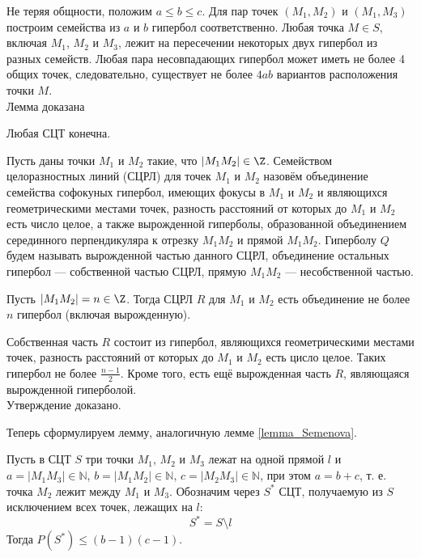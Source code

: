 \dokvo
	Не теряя общности, положим $a\leq b \leq c$.
	Для пар точек $(M_1,M_2)$ и $(M_1,M_3)$ построим семейства из $a$ и $b$ гипербол соответственно.
	Любая точка $M\in S$, включая $M_1$, $M_2$ и $M_3$, лежит на пересечении некоторых двух гипербол из разных семейств.
	Любая пара несовпадающих гипербол может иметь не более 4 общих точек, следовательно, существует не более $4ab$ вариантов расположения точки $M$.
\\ Лемма доказана

\begin{sledstvie}
	Любая СЦТ конечна.
\end{sledstvie}


\begin{opr}
	Пусть даны точки $M_1$ и $M_2$ такие, что $|M_1 M_2|\in\Z$.
	Семейством целоразностных линий (СЦРЛ) для точек $M_1$ и $M_2$ назовём объединение семейства софокуных гипербол,
	имеющих фокусы в $M_1$ и $M_2$ и являющихся геометрическими местами точек, разность расстояний от которых до $M_1$ и $M_2$ есть число целое,
	а также вырожденной гиперболы,
	образованной объединением серединного перпендикуляра к отрезку $M_1 M_2$ и прямой $M_1 M_2$.
	Гиперболу $Q$ будем называть вырожденной частью данного СЦРЛ,
	объединение остальных гипербол --- собственной частью СЦРЛ,
	прямую $M_1 M_2$ --- несобственной частью.
\end{opr}

\begin{utverzhd}
	Пусть $|M_1 M_2|= n \in\Z$.
	Тогда СЦРЛ $R$ для $M_1$ и $M_2$ есть объединение не более $n$ гипербол (включая вырожденную).
\end{utverzhd}

\dokvo
	Собственная часть $R$ состоит из гипербол, являющихся геометрическими местами точек,
	разность расстояний от которых до $M_1$ и $M_2$ есть цисло целое.
	Таких гипербол не более $\frac{n-1}{2}$.
	Кроме того, есть ещё вырожденная часть $R$, являющаяся вырожденной гиперболой.
\\ Утверждение доказано.

Теперь сформулируем лемму, аналогичную лемме \ref{lemma_Semenova}.

\begin{lemma}\label{lemma_3_tochki_na_pryamoj}
	Пусть в СЦТ $S$ три точки $M_1$, $M_2$ и $M_3$ лежат на одной прямой $l$ и 
	$a=|M_1 M_3| \in \mathbb{N}$,
	$b=|M_1 M_2| \in \mathbb{N}$,
	$c=|M_2 M_3| \in \mathbb{N}$,
	при этом $a=b+c$, т. е. точка $M_2$ лежит между $M_1$ и $M_3$.
	Обозначим через $S^*$ СЦТ, получаемую из $S$ исключением всех точек, лежащих на $l$:
	$$
		S^* = S \setminus l
	$$
	Тогда
	$P(S^*) \leq (b-1)(c-1)$.
\end{lemma}

